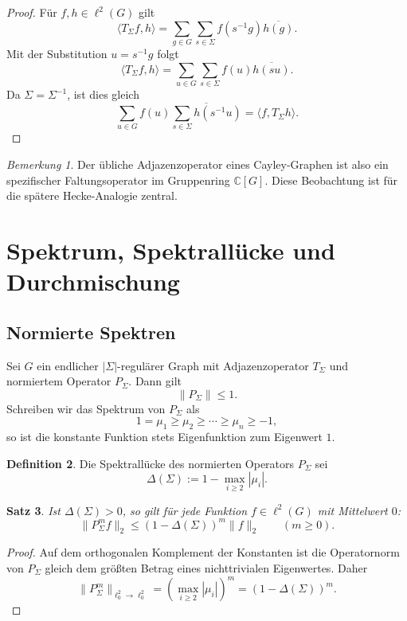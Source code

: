 \documentclass[12pt,a4paper]{article}
\theoremstyle{plain}
\newtheorem{satz}{Satz}[section]
\theoremstyle{definition}
\newtheorem{definition}[satz]{Definition}
\theoremstyle{remark}
\newtheorem{bemerkung}[satz]{Bemerkung}
\newcommand{\C}{\mathbb{C}}
\begin{document}
	\begin{proof}
		Für \(f,h\in \ell^2(G)\) gilt
		\[
		\langle T_\Sigma f,h\rangle
		=
		\sum_{g\in G}\sum_{s\in\Sigma}f(s^{-1}g)\overline{h(g)}.
		\]
		Mit der Substitution \(u=s^{-1}g\) folgt
		\[
		\langle T_\Sigma f,h\rangle
		=
		\sum_{u\in G}\sum_{s\in\Sigma}f(u)\overline{h(su)}.
		\]
		Da \(\Sigma=\Sigma^{-1}\), ist dies gleich
		\[
		\sum_{u\in G} f(u)\overline{\sum_{s\in\Sigma} h(s^{-1}u)}
		=
		\langle f,T_\Sigma h\rangle.
		\]
	\end{proof}
	
	\begin{bemerkung}
		Der übliche Adjazenzoperator eines Cayley-Graphen ist also ein
		spezifischer Faltungsoperator im Gruppenring \(\C[G]\).
		Diese Beobachtung ist für die spätere Hecke-Analogie zentral.
	\end{bemerkung}
	
	\section{Spektrum, Spektrallücke und Durchmischung}
	
	\subsection{Normierte Spektren}
	
	Sei \(G\) ein endlicher \(|\Sigma|\)-regulärer Graph mit Adjazenzoperator \(T_\Sigma\)
	und normiertem Operator \(P_\Sigma\).
	Dann gilt
	\[
	\|P_\Sigma\| \le 1.
	\]
	Schreiben wir das Spektrum von \(P_\Sigma\) als
	\[
	1=\mu_1 \ge \mu_2 \ge \cdots \ge \mu_n \ge -1,
	\]
	so ist die konstante Funktion stets Eigenfunktion zum Eigenwert \(1\).
	
	\begin{definition}
		Die Spektrallücke des normierten Operators \(P_\Sigma\) sei
		\[
		\Delta(\Sigma):=
		1-\max_{i\ge 2}|\mu_i|.
		\]
	\end{definition}
	
	\begin{satz}
		Ist \(\Delta(\Sigma)>0\), so gilt für jede Funktion \(f\in \ell^2(G)\)
		mit Mittelwert \(0\):
		\[
		\|P_\Sigma^m f\|_2 \le (1-\Delta(\Sigma))^m \|f\|_2
		\qquad (m\ge 0).
		\]
	\end{satz}
	
	\begin{proof}
		Auf dem orthogonalen Komplement der Konstanten ist die Operatornorm von
		\(P_\Sigma\) gleich dem größten Betrag eines nichttrivialen Eigenwertes.
		Daher
		\[
		\|P_\Sigma^m\|_{\ell^2_0\to \ell^2_0}
		=
		\left(\max_{i\ge 2}|\mu_i|\right)^m
		=
		(1-\Delta(\Sigma))^m.
		\]
	\end{proof}
	
\end{document}
